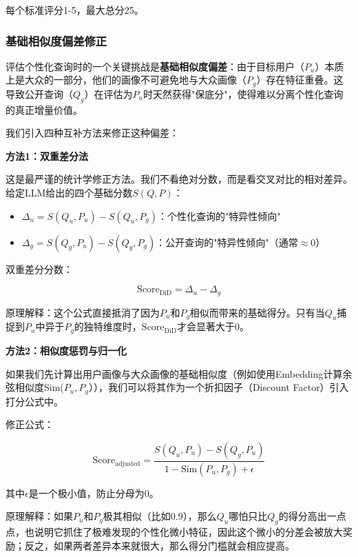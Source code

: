 \documentclass[11pt,a4paper]{article}
\begin{document}
每个标准评分1-5，最大总分25。

\subsubsection{\textbf{基础相似度偏差修正}}

评估个性化查询时的一个关键挑战是\textbf{基础相似度偏差}：由于目标用户（$P_u$）本质上是大众的一部分，他们的画像不可避免地与大众画像（$P_g$）存在特征重叠。这导致公开查询（$Q_g$）在评估为$P_u$时天然获得"保底分"，使得难以分离个性化查询的真正增量价值。

我们引入四种互补方法来修正这种偏差：

\textbf{方法1：双重差分法}

这是最严谨的统计学修正方法。我们不看绝对分数，而是看交叉对比的相对差异。给定LLM给出的四个基础分数$S(Q, P)$：

\begin{itemize}
    \item $\Delta_u = S(Q_u, P_u) - S(Q_u, P_g)$：个性化查询的"特异性倾向"
    \item $\Delta_g = S(Q_g, P_u) - S(Q_g, P_g)$：公开查询的"特异性倾向"（通常$\approx$0）
\end{itemize}

双重差分分数：

\begin{equation}
\text{Score}_{\text{DiD}} = \Delta_u - \Delta_g
\end{equation}

原理解释：这个公式直接抵消了因为$P_u$和$P_g$相似而带来的基础得分。只有当$Q_u$捕捉到$P_u$中异于$P_g$的独特维度时，$\text{Score}_{\text{DiD}}$才会显著大于0。

\textbf{方法2：相似度惩罚与归一化}

如果我们先计算出用户画像与大众画像的基础相似度（例如使用Embedding计算余弦相似度Sim($P_u, P_g$）），我们可以将其作为一个折扣因子（Discount Factor）引入打分公式中。

修正公式：

\begin{equation}
\text{Score}_{\text{adjusted}} = \frac{S(Q_u, P_u) - S(Q_g, P_u)}{1 - \text{Sim}(P_u, P_g) + \epsilon}
\end{equation}

其中$\epsilon$是一个极小值，防止分母为0。

原理解释：如果$P_u$和$P_g$极其相似（比如0.9），那么$Q_u$哪怕只比$Q_g$的得分高出一点点，也说明它抓住了极难发现的个性化微小特征，因此这个微小的分差会被放大奖励；反之，如果两者差异本来就很大，那么得分门槛就会相应提高。
\end{document}
